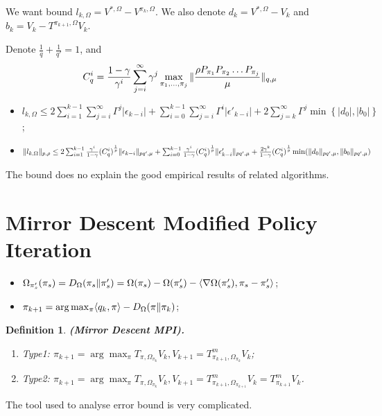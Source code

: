 \documentclass[a4paper]{article}
\newtheorem{definition}{Definition}
\begin{document}
We want bound $ l_{k,\Omega} = V^{*, \Omega} - V^{\pi_k, \Omega} $. We also denote $ d_k = V^{*, \Omega} - V_k $ and $ b_k = V_k - T^{\pi_{k+1}, \Omega}V_k $.

Denote $ \frac{1}{q} + \frac{1}{q'} = 1 $, and
\[
    C^{i}_{q} = \frac{1 - \gamma}{\gamma^i} \sum^{\infty}_{j=i} \gamma^j \max_{\pi_1, \ldots, \pi_j} \Arrowvert \frac{\rho P_{\pi_1}P_{\pi_2}\ldots P_{\pi_j}}{\mu}  \Arrowvert_{q, \mu}
\]
\begin{itemize}
    \item $ l_{k,\Omega} \le 2 \sum^{k-1}_{i=1} \sum^{\infty}_{j=i} \Gamma^j \left| \epsilon_{k-i} \right| + \sum^{k-1}_{i=0} \sum^{\infty}_{j=i} \Gamma^{i} \left| \epsilon'_{k-i} \right| + 2\sum^{\infty}_{j=k} \Gamma^{j} \min\left\{ \left| d_0 \right|, \left| b_0 \right| \right\}$;
    \item $ \Arrowvert l_{k,\Omega} \Arrowvert_{p,\rho} \le 2 \sum^{k-1}_{i=1} \frac{\gamma^i}{1 - \gamma} {(C^{i}_q)}^{\frac{1}{p} } \Arrowvert \epsilon_{k-i} \Arrowvert_{pq', \mu} + \sum^{k-1}_{i=0} \frac{\gamma^i}{1 - \gamma} {(C^{i}_{q})}^{\frac{1}{p} } \Arrowvert \epsilon'_{k-i} \Arrowvert_{pq', \mu} + \frac{2\gamma^{k}}{1 - \gamma} {(C^{i}_{q})}^{\frac{1}{p} } \min ( \Arrowvert d_0 \Arrowvert_{pq',\mu}, \Arrowvert b_0 \Arrowvert_{pq',\mu})$
\end{itemize}
The bound does no explain the good empirical results of related algorithms.

\section{Mirror Descent Modified Policy Iteration}%

\begin{itemize}
    \item $ \Omega_{\pi'_{s}}(\pi_s) = D_{\Omega}(\pi_s \Arrowvert \pi'_{s}) = \Omega(\pi_s) - \Omega(\pi'_s) - \langle \nabla \Omega(\pi'_s), \pi_s - \pi'_s \rangle $;
    \item $ \pi_{k+1} = \arg\max_{\pi} \langle q_k, \pi \rangle - D_{\Omega}(\pi \Arrowvert \pi_k) $;
\end{itemize}

\begin{definition}
    \textbf{(Mirror Descent MPI).}
    \begin{enumerate}
        \item Type1: $ \pi_{k+1} = \arg\max_{\pi} T_{\pi, \Omega_{\pi_k}}V_k, V_{k+1}=T^{m}_{\pi_{k+1}, \Omega_{\pi_k}}V_k $;
        \item Type2: $ \pi_{k+1} =  \arg\max_{\pi} T_{\pi, \Omega_{\pi_k}}V_k, V_{k+1}=T^{m}_{\pi_{k+1}, \Omega_{\pi_{k+1}}}V_k = T^{m}_{\pi_{k+1}} V_k $.
    \end{enumerate}
\end{definition}
The tool used to analyse error bound is very complicated.
\end{document}
